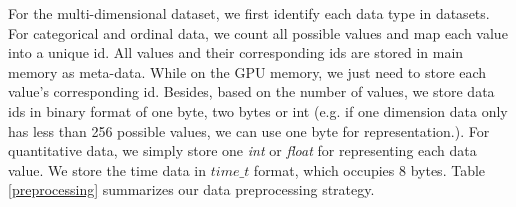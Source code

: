 \documentclass[journal]{vgtc}                %
\begin{document}
{%

For the multi-dimensional dataset, we first identify each data type in datasets. For categorical and ordinal data, we count  all possible values and map each value into a unique id. All values and their corresponding ids are stored in main memory as meta-data. While on the GPU memory, we just need to store each value's  corresponding id. Besides, based on the number of values, we store data ids in binary format of one byte, two bytes or int (e.g. if one dimension data only has less than 256 possible values, we can use one byte for representation.). For quantitative data, we simply store one \emph{int} or \emph{float} for representing each data value. We store the time data in \emph{$time\_t$} format, which occupies 8 bytes. Table \ref{preprocessing} summarizes our data preprocessing strategy.

}
\end{document}
